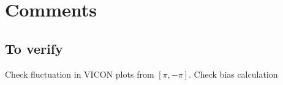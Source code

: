\documentclass[12pt]{article}
\begin{document}
\section*{Comments}

\subsection*{To verify}

Check fluctuation in VICON plots from $[\pi, -\pi]$.
Check bias calculation
\end{document}
